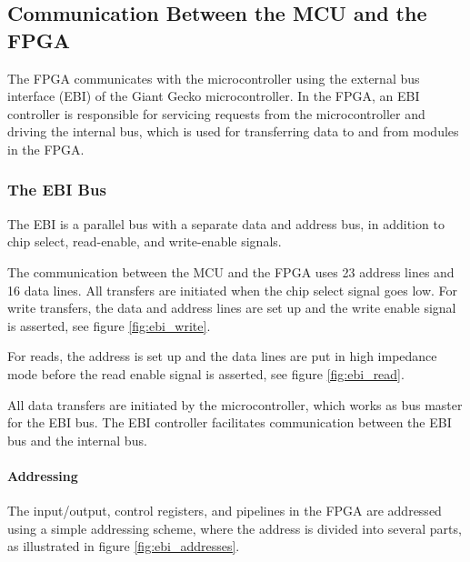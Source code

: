 
\FloatBarrier
\subsection{Communication Between the MCU and the FPGA}\label{section:fpga-buses}

The FPGA communicates with the microcontroller using the external bus interface
(EBI) of the Giant Gecko microcontroller. In the FPGA, an EBI controller is responsible
for servicing requests from the microcontroller and driving the internal bus, which
is used for transferring data to and from modules in the FPGA.

\subsubsection{The EBI Bus}
The EBI\cite{efm_ebi} is a parallel bus with a separate data and address bus, in
addition to chip select, read-enable, and write-enable signals.

The communication between the MCU and the FPGA uses 23 address lines and 16 data
lines. All transfers are initiated when the chip select signal goes low. For
write transfers, the data and address lines are set up and the write enable
signal is asserted, see figure \ref{fig:ebi_write}.	

For reads, the address is set up and the data lines are put in high impedance mode
before the read enable signal is asserted, see figure \ref{fig:ebi_read}.




All data transfers are initiated by the microcontroller, which works as bus
master for the EBI bus. The EBI controller facilitates communication between
the EBI bus and the internal bus.

\FloatBarrier
\paragraph{Addressing}

The input/output, control registers, and pipelines in the FPGA are addressed
using a simple addressing scheme, where the address is divided into several
parts, as illustrated in figure \ref{fig:ebi_addresses}.



